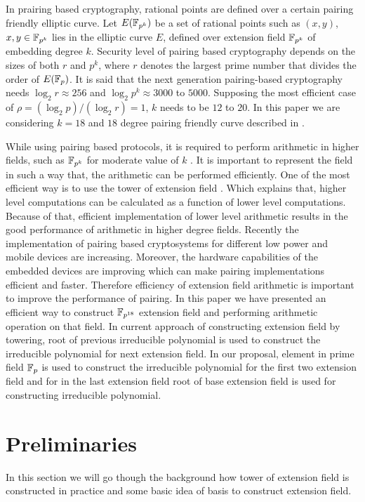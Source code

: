 In prairing based cryptography, rational points are defined over a certain pairing friendly elliptic curve. Let $E(\mathbb{F}_{p^k})$ be a set of rational points such as $(x, y)$,  $x, y \in \mathbb{F}_{p^k}$ lies in the elliptic curve $E$, defined over extension field $\mathbb{F}_{p^k}$ of embedding degree $k$. Security level of pairing based cryptography depends on the sizes of both $r$ and $p^k$, where $r$ denotes the largest prime number that divides the order of $E(\mathbb{F}_p)$. It is said that the next generation pairing-based cryptography needs $\log_2 r \approx 256$ and $\log_2 p^k \approx 3000$ to $5000$. Supposing the most efficient case of $\rho = (\log_2 p)/(\log_2 r) = 1$, $k$ needs to be $12$ to $20$.  In this paper we are considering $k=18$ and $18$ degree pairing friendly curve described in \cite{EPRINT:FreScoTes06}. 

While using pairing based protocols, it is required to perform arithmetic in higher fields, such as $\mathbb{F}_{p^k}$  for moderate value of $k$ \cite{Silverman}. It is important to represent the field in such a way that, the arithmetic can be performed efficiently.  One of the most efficient way is to use the tower of extension field \cite{const_ext}. Which explains that, higher level computations can be calculated as a function of lower level computations. Because of that, efficient implementation of lower level arithmetic results in the good performance of arithmetic in higher degree fields. Recently the implementation of pairing based cryptosystems for different low power and mobile devices are increasing. Moreover, the hardware capabilities of the embedded devices are improving which can make pairing implementations efficient and faster. Therefore efficiency of extension field arithmetic is important to improve the performance of pairing. In this paper we have presented an efficient way to construct $\mathbb{F}_{p^{18}}$  extension field and performing arithmetic operation on that field. In current approach of constructing extension field by towering, root of previous irreducible polynomial is used to construct the irreducible polynomial for next extension field. In our proposal, element in prime field $\mathbb{F}_p$ is used to construct the irreducible polynomial for the first two extension field and for in the last extension field root of base extension field is used for constructing irreducible polynomial.


\section{Preliminaries}
In this section we will go though the background how tower of extension field is constructed in practice and some basic idea of basis to construct extension field. 
